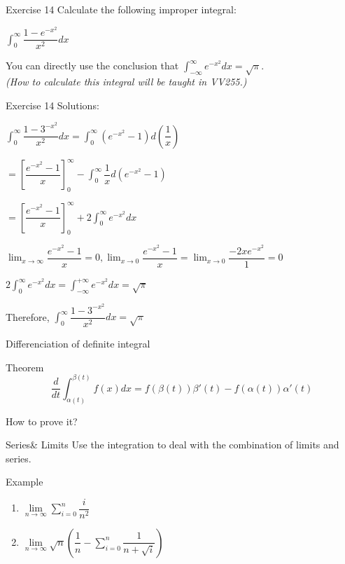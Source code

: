 \begin{frame}{Exercise 14}
    Calculate the following improper integral:\\
    \begin{center}
        $\int_{0}^{\infty} \dfrac{1-e^{-x^{2}}}{x^{2}}dx$
    \end{center}
    \bigskip
    You can directly use the conclusion that $\int_{-\infty}^{\infty}e^{-x^{2}}dx=\sqrt{\pi}$.\\
    \textit{(How to calculate this integral will be taught in VV255.)}
\end{frame}

\begin{frame}{Exercise 14}
    Solutions:

    $\int_0^{\infty}\dfrac{1-3^{-x^2}}{x^2}dx = \int_0^{\infty}(e^{-x^2}-1)d(\dfrac{1}{x})$

    $= \left[\dfrac{e^{-x^2} - 1}{x}\right]_0^{\infty} - \int_{0}^{\infty}\dfrac{1}{x}d(e^{-x^2}-1)$

    $= \left[\dfrac{e^{-x^2} - 1}{x}\right]_0^{\infty} + 2\int_0^{\infty}e^{-x^2}dx$

    $\lim_{x\rightarrow\infty}\dfrac{e^{-x^2}-1}{x} = 0, \lim_{x\rightarrow0} \dfrac{e^{-x^2}-1}{x} = \lim_{x\rightarrow0} \dfrac{-2xe^{-x^2}}{1} = 0$

    $2\int_0^{\infty}e^{-x^2}dx = \int_{-\infty}^{+\infty}e^{-x^2}dx = \sqrt{\pi}$

    Therefore, $\int_0^{\infty}\dfrac{1-3^{-x^2}}{x^2}dx = \sqrt{\pi}$

\end{frame}
\begin{frame}{Differenciation of definite integral}
    \begin{block}{Theorem}
        $$ \dfrac{d}{dt}\int_{\alpha(t)}^{\beta(t)}f(x)dx=f(\beta(t))\beta'(t)-f(\alpha(t))\alpha'(t)$$
    \end{block}
    How to prove it?
\end{frame}
\begin{frame}{Series\& Limits}
    Use the integration to deal with the combination of limits and series.
    \begin{block}{Example}
        \begin{enumerate}
            \item $\lim\limits_{n\to\infty}\sum\limits_{i=0}^{n}\dfrac{i}{n^2} $
            \item $\lim\limits_{n\to\infty}\sqrt{n}(\dfrac{1}{n}-\sum\limits_{i=0}^{n}\dfrac{1}{n+\sqrt{i}})$

        \end{enumerate}
    \end{block}
\end{frame}

